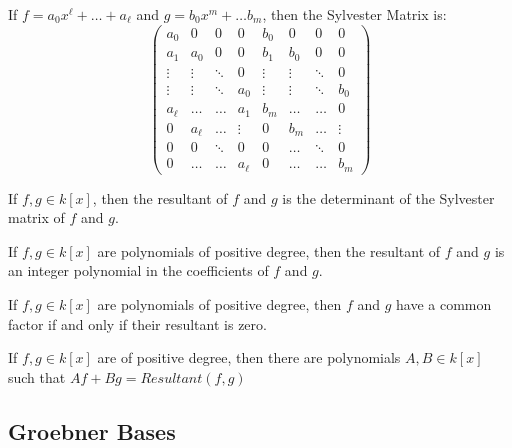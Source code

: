 \documentclass[crop=false,class=book,oneside]{standalone}
\begin{document}
                \begin{definition}
                If $f = a_0 x^{\ell} +\hdots + a_{\ell}$ and $g = b_0 x^m + \hdots b_m$, then the Sylvester Matrix is:
                \begin{equation*}
                    \begin{pmatrix} a_0 & 0 & 0 & 0 & b_0 & 0 & 0 & 0 \\ a_1 & a_0 & 0 & 0 & b_1 & b_0 & 0 & 0 \\ \vdots & \vdots & \ddots & 0 & \vdots & \vdots & \ddots & 0 \\ \vdots & \vdots & \ddots & a_{0} & \vdots & \vdots & \ddots & b_0 \\ a_{\ell} & \hdots & \hdots & a_{1} & b_{m} & \hdots & \hdots & 0 \\ 0 & a_{\ell} & \hdots & \vdots & 0 & b_{m} & \hdots & \vdots\\ 0 & 0 & \ddots & 0 & 0 & \hdots & \ddots & 0 \\ 0 & \hdots & \hdots & a_{\ell} & 0 & \hdots & \hdots & b_{m} \end{pmatrix}
                \end{equation*}
                \end{definition}
                \begin{theorem}
                If $f,g \in k[x]$, then the resultant of $f$ and $g$ is the determinant of the Sylvester matrix of $f$ and $g$.
                \end{theorem}
                \begin{theorem}
                If $f,g\in k[x]$ are polynomials of positive degree, then the resultant of $f$ and $g$ is an integer polynomial in the coefficients of $f$ and $g$.
                \end{theorem}
                \begin{theorem}
                If $f,g\in k[x]$ are polynomials of positive degree, then $f$ and $g$ have a common factor if and only if their resultant is zero.
                \end{theorem}
                \begin{theorem}
                If $f,g\in k[x]$ are of positive degree, then there are polynomials $A,B \in k[x]$ such that $Af + Bg = Resultant(f,g)$
                \end{theorem}
        \subsection{Groebner Bases}
\end{document}
